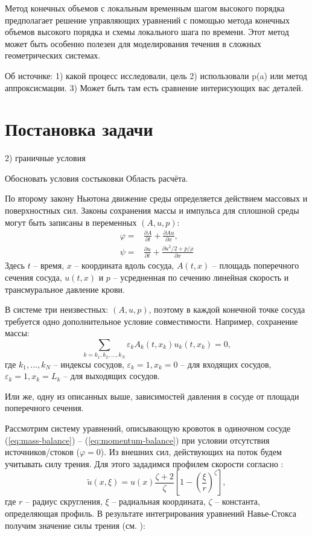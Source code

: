 Метод конечных объемов с локальным временным шагом высокого порядка~\cite{mueller:2015} предполагает решение управляющих уравнений 
с помощью метода конечных объемов высокого порядка и схемы локального шага по времени. 
Этот метод может быть особенно полезен для моделирования течения в сложных геометрических системах.


Об источнке:
1) какой процесс исследовали, цель
2) использовали p(a) или метод аппроксисмации.
3) Может быть там есть сравнение интерисующих вас деталей.



\section{Постановка задачи}
2) граничные условия

Обосновать условия состыковки
Область расчёта.

По второму закону Ньютона движение среды определяется действием массовых и поверхностных сил. 
Законы сохранения массы и импульса для сплошной среды могут быть
записаны в переменных $(A, u, p)$: 
\begin{align}
    \label{eq:mass-balance}
    \varphi=&\frac{\partial A}{\partial t}+\frac{\partial Au}{\partial x},\\
    \label{eq:momentum-balance}
    \psi=&\frac{\partial u}{\partial t}+ \frac{\partial u^2/2+p/\rho}{\partial x}
\end{align}
Здесь $t$ -- время, $x$ -- координата вдоль сосуда, $A(t, x)$ -- площадь поперечного сечения сосуда, 
$u(t, x)$ и $p$ -- усредненная по сечению линейная скорость и трансмуральное давление крови. 

В системе три неизвестных: $(A, u, p)$, поэтому в каждой конечной точке сосуда требуется одно дополнительное условие совместимости.
Например, сохранение массы:
\begin{equation}
    \label{eq:conserv-mass}
    \sum_{k=k_1,k_2,...,k_N} \varepsilon_k A_k(t,x_k)u_k(t,x_k)=0,
\end{equation}
где {$k_1,...,k_N$} -- индексы сосудов, $\varepsilon_k=1, x_k=0$ -- для входящих сосудов,
$\varepsilon_k=1, x_k=L_k$ -- для выходящих сосудов.

Или же, одну из описанных выше, зависимостей давления в сосуде от площади поперечного сечения.

Рассмотрим систему уравнений, описывающую кровоток в одиночном сосуде (\ref{eq:mass-balance}) -- (\ref{eq:momentum-balance}) при условии
отсутствия источников/стоков ($\varphi=0$).
Из внешних сил, действующих на поток будем учитывать силу трения.
Для этого зададимся профилем скорости согласно \cite{smith:2002}:
$$
\tilde u(x, \xi) = u(x) \frac{\zeta + 2}{\zeta} \left[1 - \left(\frac{\xi}{r}\right)^\zeta\right],
$$
где $r$ -- радиус скругления, $\xi$ -- радиальная координата, $\zeta$ -- константа, определяющая профиль.
В результате интегрирования уравнений Навье-Стокса получим значение силы трения (см. \cite{boileau:2015}):

